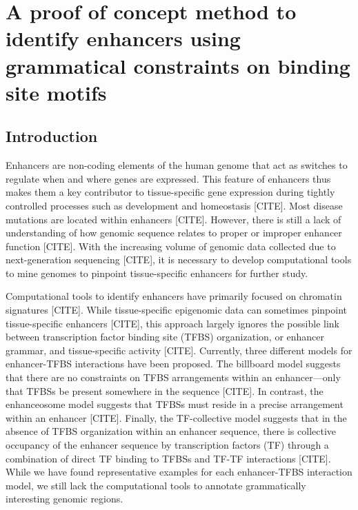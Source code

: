 \chapter{A proof of concept method to identify enhancers using grammatical constraints on binding site motifs}

\section{Introduction}

Enhancers are non-coding elements of the human genome that act as switches to regulate when and where genes are expressed. This feature of enhancers thus makes them a key contributor to tissue-specific gene expression during tightly controlled processes such as development and homeostasis [CITE]. Most disease mutations are located within enhancers [CITE]. However, there is still a lack of understanding of how genomic sequence relates to proper or improper enhancer function [CITE]. With the increasing volume of genomic data collected due to next-generation sequencing [CITE], it is necessary to develop computational tools to mine genomes to pinpoint tissue-specific enhancers for further study. 

Computational tools to identify enhancers have primarily focused on chromatin signatures [CITE]. While tissue-specific epigenomic data can sometimes pinpoint tissue-specific enhancers [CITE], this approach largely ignores the possible link between transcription factor binding site (TFBS) organization, or enhancer grammar, and tissue-specific activity [CITE]. Currently, three different models for enhancer-TFBS interactions have been proposed. The billboard model suggests that there are no constraints on TFBS arrangements within an enhancer—only that TFBSs be present somewhere in the sequence [CITE]. In contrast, the enhanceosome model suggests that TFBSs must reside in a precise arrangement within an enhancer [CITE]. Finally, the TF-collective model suggests that in the absence of TFBS organization within an enhancer sequence, there is collective occupancy of the enhancer sequence by transcription factors (TF) through a combination of direct TF binding to TFBSs and TF-TF interactions [CITE]. While we have found representative examples for each enhancer-TFBS interaction model, we still lack the computational tools to annotate grammatically interesting genomic regions. 

